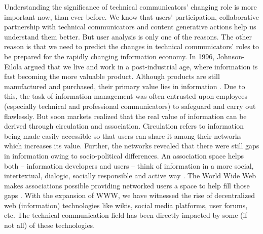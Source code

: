 Understanding the significance of technical communicators' changing role is more important now, than ever before. We know that users' participation, collaborative partnership with technical communicators and content generative actions help us understand them better. But user analysis is only one of the reasons. The other reason is that we need to predict the changes in technical communicators' roles to be prepared for the rapidly changing information economy. In 1996, Johnson-Eilola argued that we live and work in a post-industrial age, where information is fast becoming the more valuable product. Although products are still manufactured and purchased, their primary value lies in information \cite{johnson1996relocating}. Due to this, the task of information management was often entrusted upon employees (especially technical and professional communicators) to safeguard and carry out flawlessly. But soon markets realized that the real value of information can be derived through circulation and association. Circulation refers to information being made easily accessible so that users can share it among their networks which increases its value. Further, the networks revealed that there were still gaps in information owing to socio-political differences. An association space helps both – information developers and users – think of information in a more social, intertextual, dialogic,  socially responsible and active way \cite{johnson1996relocating}. The World Wide Web makes associations possible providing networked users a space to help fill those gaps \cite{johnson1996relocating}. With the expansion of WWW, we have witnessed the rise of decentralized web (information) technologies like wikis, social media platforms, user forums, etc. The technical communication field has been directly impacted by some (if not all) of these technologies.


